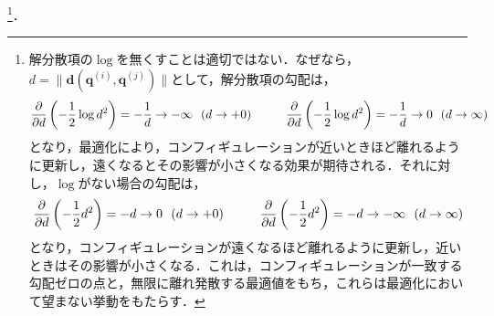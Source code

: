 \footnote{解分散項の$\log$を無くすことは適切ではない．なぜなら，$d = \| \bm{d}(\bm{q}^{(i)}, \bm{q}^{(j)}) \|$として，解分散項の勾配は，
\begin{eqnarray}
  \frac{\partial}{\partial d}\left(- \frac{1}{2} \log d^2 \right) = - \frac{1}{d} \to - \infty \ \ (d \to +0) \hspace{10mm}
  \frac{\partial}{\partial d}\left(- \frac{1}{2} \log d^2 \right) = - \frac{1}{d} \to 0 \ \ (d \to \infty)
\end{eqnarray}
となり，最適化により，コンフィギュレーションが近いときほど離れるように更新し，遠くなるとその影響が小さくなる効果が期待される．それに対し，$\log$がない場合の勾配は，
\begin{eqnarray}
  \frac{\partial}{\partial d}\left(- \frac{1}{2} d^2 \right) = - d \to 0 \ \ (d \to +0) \hspace{10mm}
  \frac{\partial}{\partial d}\left(- \frac{1}{2} d^2 \right) = - d \to - \infty \ \ (d \to \infty)
\end{eqnarray}
となり，コンフィギュレーションが遠くなるほど離れるように更新し，近いときはその影響が小さくなる．これは，コンフィギュレーションが一致する勾配ゼロの点と，無限に離れ発散する最適値をもち，これらは最適化において望まない挙動をもたらす．
}．

